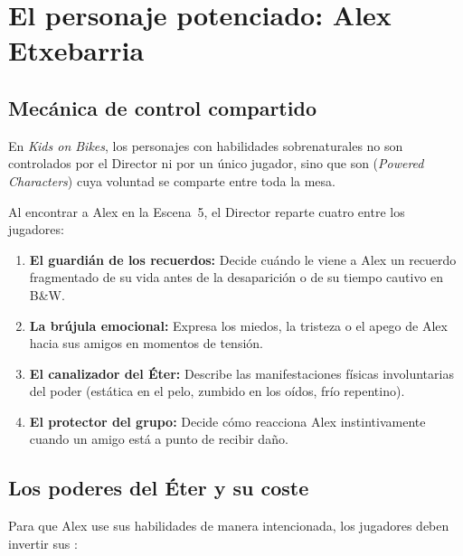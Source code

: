 \chapter{El personaje potenciado: Alex Etxebarria}

\section{Mecánica de control compartido}

En \emph{Kids on Bikes}, los personajes con habilidades sobrenaturales no son controlados por el Director ni por un único jugador, sino que son  (\emph{Powered Characters}) cuya voluntad se comparte entre toda la mesa.


Al encontrar a Alex en la Escena~5, el Director reparte cuatro  entre los jugadores:
\begin{enumerate}
  \item \textbf{El guardián de los recuerdos:} Decide cuándo le viene a Alex un recuerdo fragmentado de su vida antes de la desaparición o de su tiempo cautivo en B\&W.
  \item \textbf{La brújula emocional:} Expresa los miedos, la tristeza o el apego de Alex hacia sus amigos en momentos de tensión.
  \item \textbf{El canalizador del Éter:} Describe las manifestaciones físicas involuntarias del poder (estática en el pelo, zumbido en los oídos, frío repentino).
  \item \textbf{El protector del grupo:} Decide cómo reacciona Alex instintivamente cuando un amigo está a punto de recibir daño.
\end{enumerate}

\section{Los poderes del Éter y su coste}

Para que Alex use sus habilidades de manera intencionada, los jugadores deben invertir sus :

